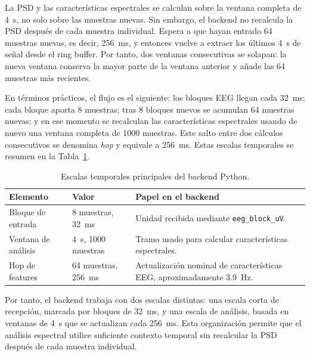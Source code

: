 \documentclass[../main.tex]{subfiles}
\begin{document}
La PSD y las características espectrales se calculan sobre la ventana completa de \SI{4}{\second}, no solo sobre las muestras nuevas. Sin embargo, el backend no recalcula la PSD después de cada muestra individual. Espera a que hayan entrado 64 muestras nuevas, es decir, \SI{256}{\milli\second}, y entonces vuelve a extraer los últimos \SI{4}{\second} de señal desde el ring buffer. Por tanto, dos ventanas consecutivas se solapan: la nueva ventana conserva la mayor parte de la ventana anterior y añade las 64 muestras más recientes.

En términos prácticos, el flujo es el siguiente: los bloques EEG llegan cada \SI{32}{\milli\second}; cada bloque aporta 8 muestras; tras 8 bloques nuevos se acumulan 64 muestras nuevas; y en ese momento se recalculan las características espectrales usando de nuevo una ventana completa de 1000 muestras. Este salto entre dos cálculos consecutivos se denomina \textit{hop} y equivale a \SI{256}{\milli\second}. Estas escalas temporales se resumen en la Tabla~\ref{tab:impl_backend_tiempos}.

\begin{table}[!htbp]
    \centering
    \caption{Escalas temporales principales del backend Python.}
    \label{tab:impl_backend_tiempos}
    \small
    \renewcommand{\arraystretch}{1.12}
    \begin{tabular}{p{}p{}p{}}
        \hline
        \textbf{Elemento} & \textbf{Valor} & \textbf{Papel en el backend} \\
        \hline
        Bloque de entrada & 8 muestras, \SI{32}{\milli\second} & Unidad recibida mediante \texttt{eeg\_block\_uV}. \\
        Ventana de análisis & \SI{4}{\second}, 1000 muestras & Tramo usado para calcular características espectrales. \\
        Hop de features & 64 muestras, \SI{256}{\milli\second} & Actualización nominal de características EEG, aproximadamente \SI{3.9}{\hertz}. \\
        \hline
    \end{tabular}
\end{table}

Por tanto, el backend trabaja con dos escalas distintas: una escala corta de recepción, marcada por bloques de \SI{32}{\milli\second}, y una escala de análisis, basada en ventanas de \SI{4}{\second} que se actualizan cada \SI{256}{\milli\second}. Esta organización permite que el análisis espectral utilice suficiente contexto temporal sin recalcular la PSD después de cada muestra individual.
\end{document}
